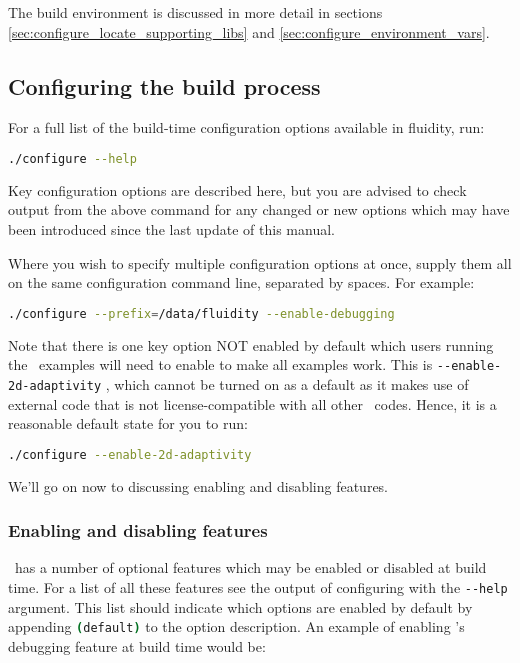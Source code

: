 The build environment is discussed in more detail in sections
\ref{sec:configure_locate_supporting_libs} and
\ref{sec:configure_environment_vars}.

\subsection{Configuring the build process}
\label{sec:configuring_the_build_process}

For a full list of the build-time configuration options available in fluidity,
run:

\begin{lstlisting}[language=Bash]
./configure --help
\end{lstlisting}

Key configuration options are described here, but you are advised to check
output from the above command for any changed or new options which may have
been introduced since the last update of this manual.

Where you wish to specify multiple configuration options at once, supply them
all on the same configuration command line, separated by spaces. For example:

\begin{lstlisting}[language=Bash]
./configure --prefix=/data/fluidity --enable-debugging
\end{lstlisting}

Note that there is one key option NOT enabled by default which users running
the \fluidity\ examples will need to enable to make all examples work. This is 
\lstinline[language=Bash]+--enable-2d-adaptivity+ , which cannot be turned on
as a default as it makes use of external code that is not license-compatible
with all other \fluidity\ codes. Hence, it is a reasonable default state for
you to run:

\begin{lstlisting}[language=Bash]
./configure --enable-2d-adaptivity
\end{lstlisting}

We'll go on now to discussing enabling and disabling features.

\subsubsection{Enabling and disabling features}
\label{sec:configure_enable_disable_features}

\fluidity\ has a number of optional features which may be enabled or disabled at
build time. For a list of all these features see the output of configuring with
the \lstinline[language=Bash]+--help+ argument. This list should indicate which
options are enabled by default by appending
\lstinline[language=Bash]+(default)+ to the option description. An example of
enabling \fluidity's debugging feature at build time would be:

